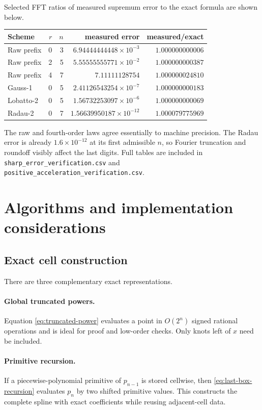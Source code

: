 \documentclass[11pt]{article}
\theoremstyle{definition}
\theoremstyle{remark}
\begin{document}
Selected FFT ratios of measured supremum error to the exact formula are shown below.

\begin{center}
\begin{tabular}{@{}lrrrr@{}}
\toprule
Scheme & $r$ & $n$ & measured error & measured/exact\\
\midrule
Raw prefix & 0 & 3 & $6.94444444448\times10^{-3}$ & $1.000000000006$\\
Raw prefix & 2 & 5 & $5.55555555771\times10^{-2}$ & $1.000000000387$\\
Raw prefix & 4 & 7 & $7.11111128754$ & $1.000000024810$\\
Gauss-1 & 0 & 5 & $2.41126543254\times10^{-7}$ & $1.000000000183$\\
Lobatto-2 & 0 & 5 & $1.56732253097\times10^{-6}$ & $1.000000000069$\\
Radau-2 & 0 & 7 & $1.56639950187\times10^{-12}$ & $1.000079775969$\\
\bottomrule
\end{tabular}
\end{center}

The raw and fourth-order laws agree essentially to machine precision.  The Radau error
is already $1.6\times10^{-12}$ at its first admissible $n$, so Fourier truncation and
roundoff visibly affect the last digits.  Full tables are included in
\texttt{sharp\_error\_verification.csv} and
\texttt{positive\_acceleration\_verification.csv}.

\section{Algorithms and implementation considerations}
\label{sec:algorithms}

\subsection{Exact cell construction}

There are three complementary exact representations.

\paragraph{Global truncated powers.}
Equation \cref{eq:truncated-power} evaluates a point in $O(2^n)$ signed rational
operations and is ideal for proof and low-order checks.  Only knots left of $x$ need be
included.

\paragraph{Primitive recursion.}
If a piecewise-polynomial primitive of $p_{n-1}$ is stored cellwise, then
\cref{eq:last-box-recursion} evaluates $p_n$ by two shifted primitive values.  This
constructs the complete spline with exact coefficients while reusing adjacent-cell data.
\end{document}
